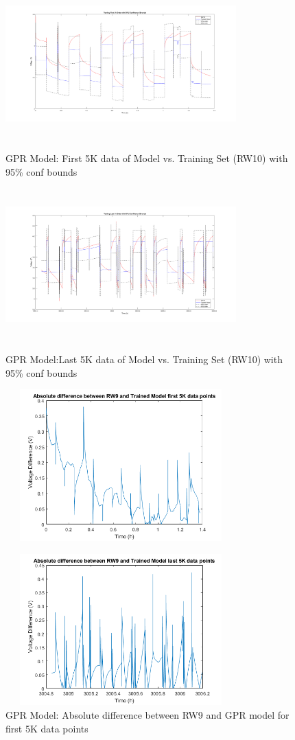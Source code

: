 \begin{figure}
\begin{multicols}{2}
	\includegraphics[height=2.3in, width=3.5in]{figures/GPR/first_5k_rw10_v_model_w_bounds}
	\caption{GPR Model: First 5K data of Model vs. Training Set (RW10) with 95\% conf bounds}
	\label{fig:first_5k_rw10_v_model_w_bounds}
	\includegraphics[height=2.3in, width=3.5in]{figures/GPR/last_5k_rw10_v_model_w_bounds}
	\caption{GPR Model:Last 5K data of Model vs. Training Set (RW10) with 95\% conf bounds}
	\label{fig:last_5k_rw10_v_model_w_bounds}
	\includegraphics[height=2.3in, width=3.5in]{figures/GPR/first_5k_rw9_abs_v_diff}
	\caption{GPR Model: Absolute difference between RW9 and GPR model for first 5K data points}
	\label{fig:first_5k_rw9_abs_v_diff}
	\includegraphics[height=2.3in, width=3.5in]{figures/GPR/last_5k_rw9_abs_v_diff}

\end{multicols}
\end{figure}

